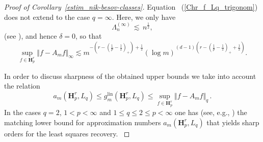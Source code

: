 \documentclass[a4paper,12pt]{amsart}
\theoremstyle{definition}
\theoremstyle{remark}
\newcommand{\lin}{\ensuremath{\mathrm{lin}}}
\begin{document}
\begin{proof}[Proof of Corollary~\ref{estim_nik-besov-classes}]
{Equation~  {(\ref{Chr_f_Lq_trigonom})} does not extend to the case $q=\infty$.
Here, we only have}
\begin{equation}\label{Chr_f_Linfty_trigono}
\Lambda^{(\infty)}_n \,\lesssim\, n^{\frac12},
\end{equation}
(see \cite[Thm.~2.4.8]{DTU18}),
and hence {$\delta=0$, so that} 
$$
\sup_{f \in \mathbf{H}^r_p} \Vert f - A_{m} f  \Vert_\infty	 \lesssim 
m^{-(r-(\frac{1}{p}-\frac{1}{2})_+) + \frac12}
(\log m)^{(d-1)\left(r-(\frac{1}{p}-\frac{1}{2})_+ + \frac{1}{2} \right)}.
$$

 {In order to discuss sharpness of the obtained upper bounds we take into account the relation 
$$
a_m(\mathbf{H}^r_p, L_q) \leq g_m^{\lin} (\mathbf{H}^r_p, L_q) \leq 
\sup_{f \in \mathbf{H}^r_p} \Vert f - A_{m} f  \Vert_q\,.	
$$
In the cases $q=2$, $1<p <\infty$ and $1\leq q \leq2\leq p < \infty$ one has (see, e.g., \cite[Thm. 4.5.2]{DTU18}) the matching lower bound for approximation numbers $a_m(\mathbf{H}^r_p, L_q)$ that yields sharp orders for the least squares recovery.  
}
\end{proof}
\end{document}
